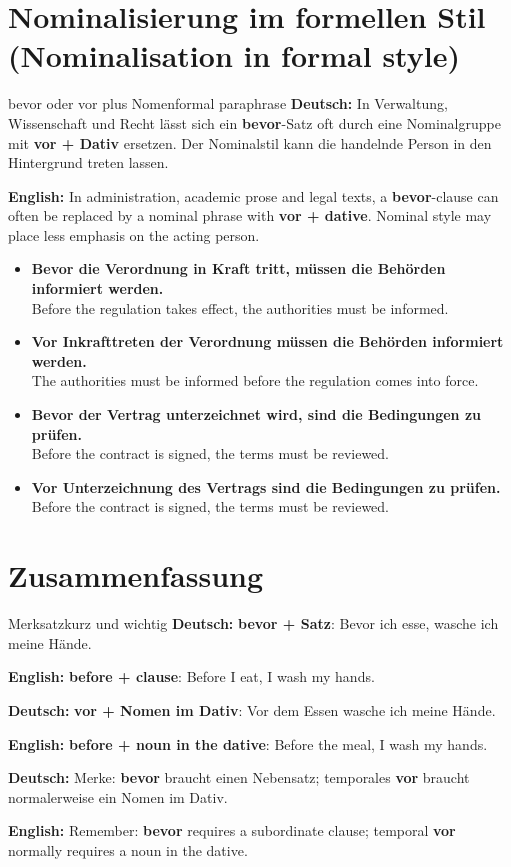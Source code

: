 \documentclass[a4paper,11pt]{article}
\newcommand{\GermanText}[1]{\textbf{Deutsch: }#1\par}
\newcommand{\EnglishText}[1]{{\small\color{SoftGray}\textbf{English: }#1\par}}
\newcommand{\ExampleItem}[2]{\item \textbf{#1}\\{\small\color{SoftGray}#2}}
\begin{document}
    \section{Nominalisierung im formellen Stil (Nominalisation in formal style)}
        \begin{grammarentry}{bevor oder vor plus Nomen}{formal paraphrase}
            \GermanText{In Verwaltung, Wissenschaft und Recht lässt sich ein \textbf{bevor}-Satz oft durch eine Nominalgruppe mit \textbf{vor + Dativ} ersetzen. Der Nominalstil kann die handelnde Person in den Hintergrund treten lassen.}
            \EnglishText{In administration, academic prose and legal texts, a \textbf{bevor}-clause can often be replaced by a nominal phrase with \textbf{vor + dative}. Nominal style may place less emphasis on the acting person.}
        \end{grammarentry}
        \begin{exbox}
            \begin{itemize}
                \ExampleItem{Bevor die Verordnung in Kraft tritt, müssen die Behörden informiert werden.}{Before the regulation takes effect, the authorities must be informed.}
                \ExampleItem{Vor Inkrafttreten der Verordnung müssen die Behörden informiert werden.}{The authorities must be informed before the regulation comes into force.}
                \ExampleItem{Bevor der Vertrag unterzeichnet wird, sind die Bedingungen zu prüfen.}{Before the contract is signed, the terms must be reviewed.}
                \ExampleItem{Vor Unterzeichnung des Vertrags sind die Bedingungen zu prüfen.}{Before the contract is signed, the terms must be reviewed.}
            \end{itemize}
        \end{exbox}
    \section{Zusammenfassung}

        \begin{grammarentry}{Merksatz}{kurz und wichtig}
            \GermanText{\textbf{bevor + Satz}: Bevor ich esse, wasche ich meine Hände.}
            \EnglishText{\textbf{before + clause}: Before I eat, I wash my hands.}

            \GermanText{\textbf{vor + Nomen im Dativ}: Vor dem Essen wasche ich meine Hände.}
            \EnglishText{\textbf{before + noun in the dative}: Before the meal, I wash my hands.}

            \GermanText{Merke: \textbf{bevor} braucht einen Nebensatz; temporales \textbf{vor} braucht normalerweise ein Nomen im Dativ.}
            \EnglishText{Remember: \textbf{bevor} requires a subordinate clause; temporal \textbf{vor} normally requires a noun in the dative.}
        \end{grammarentry}
\end{document}
